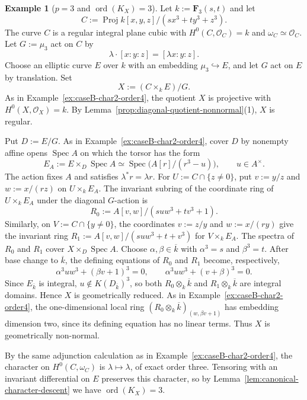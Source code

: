 \documentclass[10pt,abstract=true]{scrartcl}
\numberwithin{equation}{section}
\theoremstyle{definition}
\newtheorem{example}[theorem]{Example}
\theoremstyle{remark}
\DeclareMathOperator\Proj{Proj}
\DeclareMathOperator\ord{ord}
\begin{document}
\begin{example}[$p=3$ and $\ord(K_X)=3$]\label{ex:caseB-order3}%
  Let $k:=\mathbf F_3(s,t)$ and let
  \[
    C:=\Proj k[x,y,z]/(sx^3+ty^3+z^3).
  \]
  The curve $C$ is a regular integral plane cubic with $H^0(C,\mathcal O_C)=k$ and $\omega_C\simeq\mathcal O_C$.
  Let $G:=\mu_3$ act on $C$ by
  \[
    \lambda\cdot[x:y:z]=[\lambda x:y:z].
  \]
  Choose an elliptic curve $E$ over $k$ with an embedding $\mu_3\hookrightarrow E$, and let $G$ act on $E$ by translation.
  Set
  \[
    X:=(C\times_kE)/G.
  \]
  As in Example~\ref{ex:caseB-char2-order4}, the quotient $X$ is projective with $H^0(X,\mathcal O_X)=k$.
  By Lemma~\ref{prop:diagonal-quotient-nonnormal}\textup{(1)}, $X$ is regular.

  Put $D:=E/G$.
  As in Example~\ref{ex:caseB-char2-order4}, cover $D$ by nonempty affine opens $\operatorname{Spec}A$ on which the torsor has the form
  \[
    E_A:=E\times_D\operatorname{Spec}A
    \simeq\operatorname{Spec}\bigl(A[r]/(r^3-u)\bigr),
    \qquad u\in A^\times.
  \]
  The action fixes $A$ and satisfies $\lambda^*r=\lambda r$.
  For $U:=C\cap\{z\ne0\}$, put $v:=y/z$ and $w:=x/(rz)$ on $U\times_k E_A$.
  The invariant subring of the coordinate ring of $U\times_k E_A$ under the diagonal $G$-action is
  \[
    R_0:=A[v,w]/(su w^3+tv^3+1).
  \]
  Similarly, on $V:=C\cap\{y\ne0\}$, the coordinates $v:=z/y$ and $w:=x/(ry)$ give the invariant ring $R_1:=A[v,w]/(su w^3+t+v^3)$ for $V\times_k E_A$.
  The spectra of $R_0$ and $R_1$ cover $X\times_D\operatorname{Spec}A$.
  Choose $\alpha,\beta\in\overline{k}$ with $\alpha^3=s$ and $\beta^3=t$.
  After base change to $\overline{k}$, the defining equations of $R_0$ and $R_1$ become, respectively,
  \[
    \alpha^3u w^3+(\beta v+1)^3=0,
    \qquad
    \alpha^3u w^3+(v+\beta)^3=0.
  \]
  Since $E_{\overline{k}}$ is integral, $u\notin K(D_{\overline{k}})^3$, so both $R_0\otimes_k\overline{k}$ and $R_1\otimes_k\overline{k}$ are integral domains.  Hence $X$ is geometrically reduced.
  As in Example~\ref{ex:caseB-char2-order4}, the one-dimensional local ring $(R_0\otimes_k\overline{k})_{(w,\beta v+1)}$ has embedding dimension two, since its defining equation has no linear terms.
  Thus $X$ is geometrically non-normal.

  By the same adjunction calculation as in Example~\ref{ex:caseB-char2-order4}, the character on $H^0(C,\omega_C)$ is $\lambda\mapsto\lambda$, of exact order three.
  Tensoring with an invariant differential on $E$ preserves this character, so by Lemma~\ref{lem:canonical-character-descent} we have $\ord(K_X)=3$.
\end{example}
\end{document}
